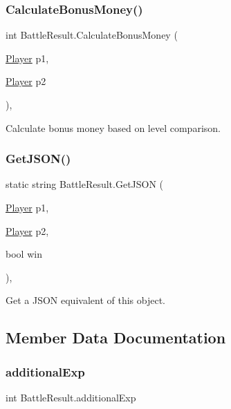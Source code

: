 \subsubsection{\texorpdfstring{CalculateBonusMoney()}{CalculateBonusMoney()}}
{\footnotesize\ttfamily int Battle\+Result.\+Calculate\+Bonus\+Money (\begin{DoxyParamCaption}\item[{\mbox{\hyperlink{class_player}{Player}}}]{p1,  }\item[{\mbox{\hyperlink{class_player}{Player}}}]{p2 }\end{DoxyParamCaption})\hspace{0.3cm}{\ttfamily [inline]}, {\ttfamily [private]}}



Calculate bonus money based on level comparison. 

\mbox{\label{class_battle_result_a269702cb7e87a7029e0ff374eefd5547}} 
\subsubsection{\texorpdfstring{GetJSON()}{GetJSON()}}
{\footnotesize\ttfamily static string Battle\+Result.\+Get\+J\+S\+ON (\begin{DoxyParamCaption}\item[{\mbox{\hyperlink{class_player}{Player}}}]{p1,  }\item[{\mbox{\hyperlink{class_player}{Player}}}]{p2,  }\item[{bool}]{win }\end{DoxyParamCaption})\hspace{0.3cm}{\ttfamily [inline]}, {\ttfamily [static]}}



Get a J\+S\+ON equivalent of this object. 



\subsection{Member Data Documentation}
\mbox{\label{class_battle_result_afc0db86910169071de1574e338681970}} 
\subsubsection{\texorpdfstring{additionalExp}{additionalExp}}
{\footnotesize\ttfamily int Battle\+Result.\+additional\+Exp}




